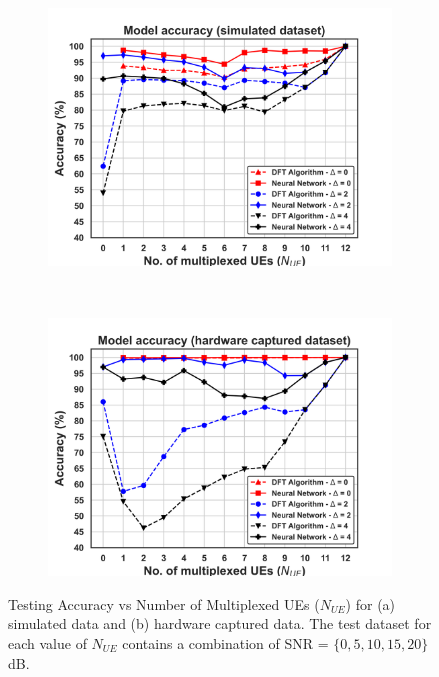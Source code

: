 \documentclass[journal]{IEEEtran}
\begin{document}
\begin{figure}[ht!]
    \captionsetup{justification=justified}
     \centering
     \begin{subfigure}[b]{0.48\textwidth}
         \centering
         \includegraphics[width=\textwidth]{Figures/Acc_vs_UE_FCN_3_512_1638k_train_sim_test_sim_in_sz_25_3_layers_512_512_512_nns_out_sz_12_fading_SNR_10dB_slots_13_mux_ue_0__12_epochs_150.png}
         \caption{}
         \label{fig: acc_vs_mux_ue_sim}
     \end{subfigure}
     \\
     \begin{subfigure}[b]{0.48\textwidth}
         \centering
         \includegraphics[width=\textwidth]{Figures/Acc_vs_UE_FCN_3_512_1638k_train_sim_test_hw_in_sz_25_3_layers_512_512_512_nns_out_sz_12_fading_SNR_10dB_slots_13_mux_ue_0__12_epochs_150.png}
         \caption{}
         \label{fig: acc_vs_mux_ue_hw}
     \end{subfigure}
        \caption{Testing Accuracy vs Number of Multiplexed UEs ($N_{UE}$) for (a) simulated data and (b) hardware captured data. The test dataset for each value of $N_{UE}$ contains a combination of SNR = $\{0, 5, 10, 15, 20\}$ dB.}
        \label{fig: acc_vs_mux_ue}
\end{figure}
\end{document}
